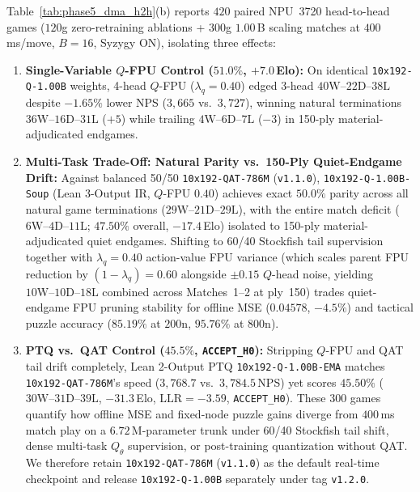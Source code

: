 \documentclass[10pt,twocolumn]{article}
\begin{document}
Table~\ref{tab:phase5_dma_h2h}(b) reports $420$ paired NPU~3720 head-to-head games ($120$g zero-retraining ablations + $300$g $1.00$\,B scaling matches at $400$\,ms/move, $B=16$, Syzygy ON), isolating three effects:
\begin{enumerate}
  \item \textbf{Single-Variable $Q$-FPU Control ($51.0\%$, $+7.0$\,Elo):} On identical \texttt{10x192-Q-1.00B} weights, 4-head $Q$-FPU ($\lambda_q=0.40$) edged 3-head $40\text{W}\text{--}22\text{D}\text{--}38\text{L}$ despite $-1.65\%$ lower NPS ($3{,}665$ vs.\ $3{,}727$), winning natural terminations $36\text{W}\text{--}16\text{D}\text{--}31\text{L}$ ($+5$) while trailing $4\text{W}\text{--}6\text{D}\text{--}7\text{L}$ ($-3$) in 150-ply material-adjudicated endgames.
  \item \textbf{Multi-Task Trade-Off: Natural Parity vs.\ 150-Ply Quiet-Endgame Drift:} Against balanced 50/50 \texttt{10x192-QAT-786M} (\texttt{v1.1.0}), \texttt{10x192-Q-1.00B-Soup} (Lean 3-Output IR, $Q$-FPU $0.40$) achieves exact $50.0\%$ parity across all natural game terminations ($29\text{W}\text{--}21\text{D}\text{--}29\text{L}$), with the entire match deficit ($6\text{W}\text{--}4\text{D}\text{--}11\text{L}$; $47.50\%$ overall, $-17.4$\,Elo) isolated to 150-ply material-adjudicated quiet endgames. Shifting to 60/40 Stockfish tail supervision together with $\lambda_q=0.40$ action-value FPU variance (which scales parent FPU reduction by $(1-\lambda_q)=0.60$ alongside $\pm 0.15$ $Q$-head noise, yielding $10\text{W}\text{--}10\text{D}\text{--}18\text{L}$ combined across Matches~1--2 at ply~150) trades quiet-endgame FPU pruning stability for offline MSE ($0.04578$, $-4.5\%$) and tactical puzzle accuracy ($85.19\%$ at $200\text{n}$, $95.76\%$ at $800\text{n}$).
  \item \textbf{PTQ vs.\ QAT Control ($45.5\%$, \texttt{ACCEPT\_H0}):} Stripping $Q$-FPU and QAT tail drift completely, Lean 2-Output PTQ \texttt{10x192-Q-1.00B-EMA} matches \texttt{10x192-QAT-786M}'s speed ($3{,}768.7$ vs.\ $3{,}784.5$\,NPS) yet scores $45.50\%$ ($30\text{W}\text{--}31\text{D}\text{--}39\text{L}$, $-31.3$\,Elo, $\mathrm{LLR}=-3.59$, \texttt{ACCEPT\_H0}). These $300$ games quantify how offline MSE and fixed-node puzzle gains diverge from $400$\,ms match play on a $6.72$\,M-parameter trunk under 60/40 Stockfish tail shift, dense multi-task $Q_\theta$ supervision, or post-training quantization without QAT. We therefore retain \texttt{10x192-QAT-786M} (\texttt{v1.1.0}) as the default real-time checkpoint and release \texttt{10x192-Q-1.00B} separately under tag \texttt{v1.2.0}.
\end{enumerate}
\end{document}
